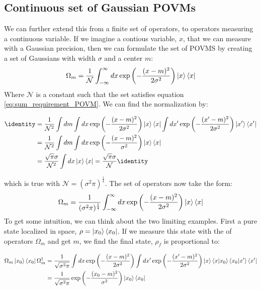 \subsection{Continuous set of Gaussian POVMs}
We can further extend this from a finite set of operators, to operators measuring a continuous variable. If we imagine a contious variable, $x$, that we can measure with a Gaussian precision, then we can formulate the set of POVMS by creating a set of Gaussians with width $\sigma$ and a center $m$:
\begin{equation}
    \Omega_m = \frac{1}{\mathcal{N}}\int_{-\infty}^\infty dx \exp\left(-\frac{(x- m)^2}{2\sigma^2}\right)\ket{x}\bra{x}
\end{equation}
Where $\mathcal{N}$ is a constant such that the set satisfies equation \ref{eq:sum_requirement_POVM}. We can find the normalization by:
\begin{fullwidth}
\begin{align*}
    \identity &= \frac{1}{\mathcal{N}^2}\int dm \int dx \exp\left(-\frac{(x- m)^2}{2\sigma^2}\right)\ket{x}\bra{x}\int dx' \exp\left(-\frac{(x'- m)^2}{2\sigma^2}\right)\ket{x'}\bra{x'} \\
              &= \frac{1}{\mathcal{N}^2}\int dm \int dx \exp\left(-\frac{(x- m)^2}{\sigma^2}\right)\ket{x}\bra{x} \\
              &= \frac{\sqrt{\pi}\sigma }{\mathcal{N}^2} \int dx \ket{x}\bra{x} = \frac{\sqrt{\pi}\sigma }{\mathcal{N}} \identity 
\end{align*}
\end{fullwidth}
which is true with $\mathcal{N}=(\sigma^2 \pi)^\frac14$. The set of operators now take the form:
\begin{equation}
    \Omega_m = \frac{1}{(\sigma^2 \pi)^\frac14}\int_{-\infty}^\infty dx \exp\left(-\frac{(x- m)^2}{2\sigma^2}\right)\ket{x}\bra{x}
\end{equation}
To get some intuition, we can think about the two limiting examples. First a pure state localized in space, $\rho = \ket{x_0}\bra{x_0}$. If we measure this state with the of operators $\Omega_m$ and get $m$, we find the final state, $\rho_f$ is proportional to:
\begin{fullwidth}
\begin{align}
    \Omega_m \ket{x_0}\bra{x_0}  \Omega_m^\dagger &= \frac{1}{\sqrt{\sigma^2\pi}}\int dx \exp\left(-\frac{(x- m)^2}{2\sigma^2}\right)\int dx' \exp\left(-\frac{(x'- m)^2}{2\sigma^2}\right)\ket{x}\bra{x}\ket{x_0}\bra{x_0}\ket{x'}\bra{x'} \nonumber \\
    &= \frac{1}{\sqrt{\sigma^2\pi}}\exp\left(-\frac{(x_0- m)^2}{\sigma^2}\right)\ket{x_0}\bra{x_0}
\end{align}
\end{fullwidth}
